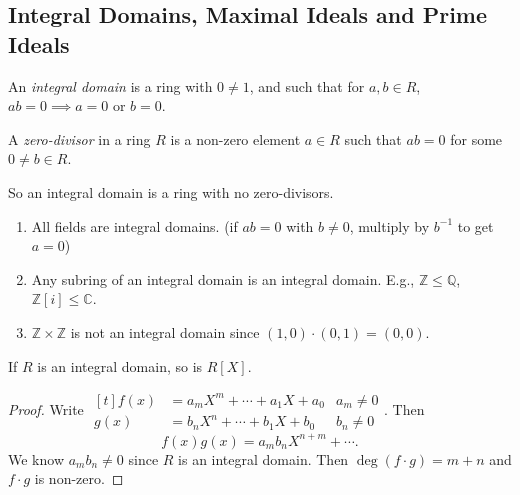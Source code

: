 \subsection{Integral Domains, Maximal Ideals and Prime Ideals}
\leavevmode
\begin{definition}
    An \textit{integral domain}  is a ring with \(0 \neq 1\), and such that for \(a, b \in R\), \(ab = 0 \implies a = 0\) or \(b = 0\).

    A \textit{zero-divisor} in a ring \(R\) is a non-zero element \(a \in R\) such that \(ab = 0\) for some \(0 \neq b \in R\).

    So an integral domain is a ring with no zero-divisors.
\end{definition}
\begin{example}
    \leavevmode
    \begin{enumerate}
        \item All fields are integral domains. (if \(ab = 0\) with \(b \neq 0\), multiply by \(b^{-1}\) to get \(a = 0\))
        \item Any subring of an integral domain is an integral domain. E.g., \(\mathbb{Z} \leq \mathbb{Q}\), \(\mathbb{Z}[i] \leq \mathbb{C}\).
        \item \(\mathbb{Z} \times \mathbb{Z}\) is not an integral domain since \((1,0)\cdot (0,1) = (0,0)\).
    \end{enumerate}
\end{example}
\begin{lemma}
    If \(R\) is an integral domain, so is \(R[X]\).
\end{lemma}
\begin{proof}
    Write \(\begin{aligned}[t]f(x) &= a_m X^m + \cdots + a_1 X + a_0&a_m \neq 0\\ g(x) &= b_n X^n + \cdots + b_1 X + b_0 & b_n \neq 0\end{aligned}\). Then
    \[
        f(x)g(x) = a_{m}b_n X^{n + m} + \cdots.
    \]
    We know \(a_m b_n \neq 0\) since \(R\) is an integral domain. Then \(\deg(f\cdot g) = m + n\) and \(f\cdot g\) is non-zero.
\end{proof}